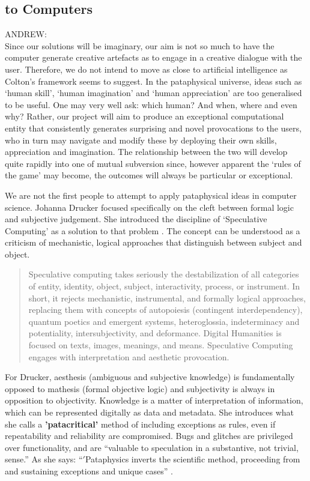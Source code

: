 \subsection{to Computers}

\begin{draft}
  ANDREW:\\
  Since our solutions will be imaginary, our aim is not so much to have the computer generate creative artefacts as to engage in a creative dialogue with the user. Therefore, we do not intend to move as close to artificial intelligence as Colton's framework seems to suggest. In the pataphysical universe, ideas such as `human skill', `human imagination' and `human appreciation' are too generalised to be useful. One may very well ask: which human? And when, where and even why? Rather, our project will aim to produce an exceptional computational entity that consistently generates surprising and novel provocations to the users, who in turn may navigate and modify these by deploying their own skills, appreciation and imagination. The relationship between the two will develop quite rapidly into one of mutual subversion since, however apparent the `rules of the game' may become, the outcomes will always be particular or exceptional.
\end{draft}

We are not the first people to attempt to apply pataphysical ideas in computer science. Johanna Drucker focused specifically on the cleft between formal logic and subjective judgement. She introduced the discipline of `Speculative Computing' as a solution to that problem \autocite{Drucker2007}. The concept can be understood as a criticism of mechanistic, logical approaches that distinguish between subject and object.

\begin{quote}
  Speculative computing takes seriously the destabilization of all categories of entity, identity, object, subject, interactivity, process, or instrument. In short, it rejects mechanistic, instrumental, and formally logical approaches, replacing them with concepts of autopoiesis (contingent interdependency), quantum poetics and emergent systems, heteroglossia, indeterminacy and potentiality, intersubjectivity, and deformance. Digital Humanities is focused on texts, images, meanings, and means. Speculative Computing engages with interpretation and aesthetic provocation. \autocite[p.29]{Drucker2009}
\end{quote}

For Drucker, aesthesis (ambiguous and subjective knowledge) is fundamentally opposed to mathesis (formal objective logic) and subjectivity is always in opposition to objectivity. Knowledge is a matter of interpretation of information, which can be represented digitally as data and metadata. She introduces what she calls a \textbf{'patacritical'} method of including exceptions as rules, even if repeatability and reliability are compromised. Bugs and glitches are privileged over functionality, and are ``valuable to speculation in a substantive, not trivial, sense.'' As she says: ``$'$Pataphysics inverts the scientific method, proceeding from and sustaining exceptions and unique cases'' \autocite{Drucker2007}.

